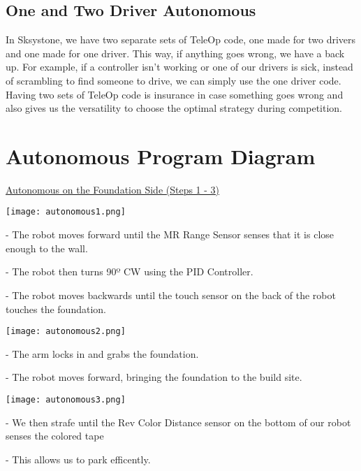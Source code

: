 \documentclass{article}
\begin{document}
\subsection{One and Two Driver Autonomous}

In Sksystone, we have two separate sets of TeleOp code, one made for two drivers and one made for one driver. This way, if anything goes wrong, we have a back up. For example, if a controller isn’t working or one of our drivers is sick, instead of scrambling to find someone to drive, we can simply use the one driver code. Having two sets of TeleOp code is insurance in case something goes wrong and also gives us the versatility to choose the optimal strategy during competition.

\section{Autonomous Program Diagram}
\begin{center}

\underline{Autonomous on the Foundation Side  (Steps 1 - 3)}

{\texttt{[image: autonomous1.png]}}

- The robot moves forward until the MR Range Sensor senses that it is close enough to the wall. \newline

- The robot then turns 90º CW using the PID Controller. \newline

- The robot moves backwards until the touch sensor on the back of the robot touches the foundation. 

{\texttt{[image: autonomous2.png]}}

\indent \indent- The arm locks in and grabs the foundation. \newline

\indent \indent - The robot moves forward, bringing the foundation to the build site. \newline

{\texttt{[image: autonomous3.png]}}

- We then strafe until the Rev Color Distance sensor on the bottom of our robot senses the colored tape \newline


- This allows us to park efficently. \newline

\end{center}
\end{document}
